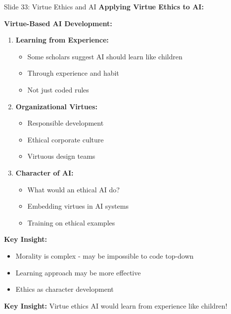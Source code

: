 \documentclass[8pt]{beamer}
\begin{document}
	\begin{frame}{Slide 33: Virtue Ethics and AI}
		\fontsize{6.5}{7.5}\selectfont
		\textbf{Applying Virtue Ethics to AI:}
		
		\vspace{0.1cm}
		\textbf{Virtue-Based AI Development:}
		\begin{enumerate}
			\item \textbf{Learning from Experience:}
			\begin{itemize}
				\item Some scholars suggest AI should learn like children
				\item Through experience and habit
				\item Not just coded rules
			\end{itemize}
			\item \textbf{Organizational Virtues:}
			\begin{itemize}
				\item Responsible development
				\item Ethical corporate culture
				\item Virtuous design teams
			\end{itemize}
			\item \textbf{Character of AI:}
			\begin{itemize}
				\item What would an ethical AI do?
				\item Embedding virtues in AI systems
				\item Training on ethical examples
			\end{itemize}
		\end{enumerate}
		
		\vspace{0.1cm}
		\textbf{Key Insight:}
		\begin{itemize}
			\item Morality is complex - may be impossible to code top-down
			\item Learning approach may be more effective
			\item Ethics as character development
		\end{itemize}
		
		\textcolor{myblue}{\textbf{Key Insight:}} Virtue ethics AI would \textcolor{myblue}{learn from experience like children}!
	\end{frame}
	
\end{document}
